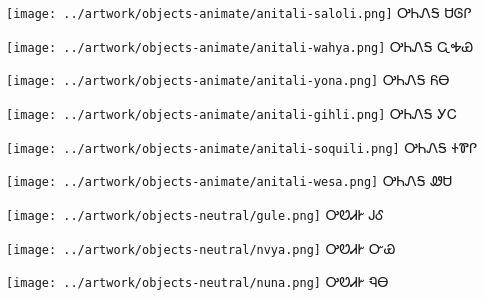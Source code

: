 \documentclass[avery5371,frame]{flashcards}%
\begin{document}
\begin{flashcard}{
\texttt{[image: ../artwork/objects-animate/anitali-saloli.png]}
}\Huge ᎤᏂᏁᎦ ᏌᎶᎵ
\end{flashcard}

\begin{flashcard}{
\texttt{[image: ../artwork/objects-animate/anitali-wahya.png]}
}\Huge ᎤᏂᏁᎦ ᏩᎭᏯ
\end{flashcard}

\begin{flashcard}{
\texttt{[image: ../artwork/objects-animate/anitali-yona.png]}
}\Huge ᎤᏂᏁᎦ ᏲᎾ
\end{flashcard}

\begin{flashcard}{
\texttt{[image: ../artwork/objects-animate/anitali-gihli.png]}
}\Huge ᎤᏂᏁᎦ ᎩᏟ
\end{flashcard}

\begin{flashcard}{
\texttt{[image: ../artwork/objects-animate/anitali-soquili.png]}
}\Huge ᎤᏂᏁᎦ ᏐᏈᎵ
\end{flashcard}

\begin{flashcard}{
\texttt{[image: ../artwork/objects-animate/anitali-wesa.png]}
}\Huge ᎤᏂᏁᎦ ᏪᏌ
\end{flashcard}


\begin{flashcard}{
\texttt{[image: ../artwork/objects-neutral/gule.png]}
}\Huge ᎤᏬᏗᎨ ᎫᎴ
\end{flashcard}

\begin{flashcard}{
\texttt{[image: ../artwork/objects-neutral/nvya.png]}
}\Huge ᎤᏬᏗᎨ ᏅᏯ
\end{flashcard}

\begin{flashcard}{
\texttt{[image: ../artwork/objects-neutral/nuna.png]}
}\Huge ᎤᏬᏗᎨ ᏄᎾ
\end{flashcard}
\end{document}
